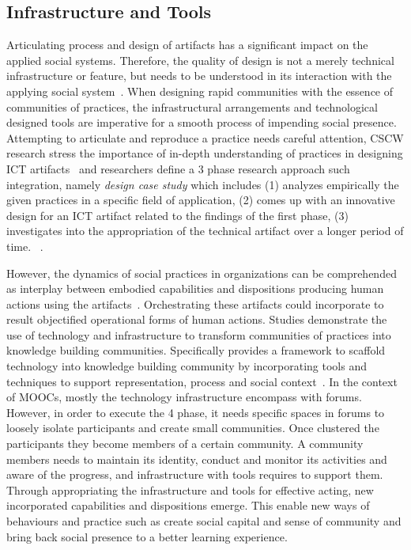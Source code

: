 \documentclass[manuscript,screen,review]{acmart}
\begin{document}
\subsection{Infrastructure and Tools}
Articulating process and design of artifacts has a significant impact on the applied social systems. Therefore, the quality of design is not a merely technical infrastructure or feature, but needs to be understood in its interaction with the applying social system~\cite{rohde2009towards}. When designing rapid communities with the essence of communities of practices, the infrastructural arrangements and technological designed tools are imperative for a smooth process of impending social presence. Attempting to articulate and reproduce a practice needs careful attention, CSCW research stress the importance of in-depth understanding of practices in designing ICT  artifacts~\cite{wulf1995towards} and researchers define a 3 phase research approach such integration, namely \textit{design case study} which includes (1) analyzes empirically the given practices in a specific field of application, (2) comes up with an innovative design for an ICT artifact related to the findings of the first phase, (3) investigates into the appropriation of the technical artifact over a longer period of time. ~\cite{wulf2011engaging}.

However, the dynamics of social practices in organizations can be comprehended as interplay between embodied capabilities and dispositions producing  human actions using the artifacts~\cite{wulf1995towards}. Orchestrating these artifacts could incorporate to result objectified operational forms of human actions. Studies demonstrate the use of technology and infrastructure to transform communities of practices into knowledge building communities. Specifically provides a framework to scaffold technology into knowledge building community by incorporating tools and techniques to support representation, process and social context~\cite{hoadley2005using}. In the context of MOOCs, mostly the technology infrastructure encompass with forums. However, in order to execute the 4 phase, it needs specific spaces in forums to loosely isolate participants and create small communities. Once clustered the participants they become members of a certain community. A community members needs to maintain its identity, conduct and monitor its activities and aware of the progress, and infrastructure with tools requires to support them.  Through appropriating the infrastructure and tools for effective acting, new incorporated capabilities and dispositions emerge. This enable new ways of behaviours and practice such as create social capital and sense of community and bring back social presence to a better learning experience.  
\end{document}
